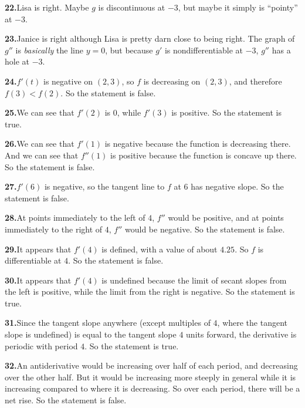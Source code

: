 \documentclass[10pt,oneside,]{book}
\newcommand{\lt}{<}
\theoremstyle{plain}
\theoremstyle{definition}
\numberwithin{equation}{section}
\newcommand{\fe}[2]{#1\mathopen{}\left(#2\right)\mathclose{}}
\newcommand{\ointerval}[2]{\left(#1,#2\right)}
\newcommand{\fd}[1]{#1'}
\newcommand{\sd}[1]{#1''}
\begin{document}
\par\smallskip
\noindent\textbf{22.}\quad{}Lisa is right.  Maybe \(g\) is discontinuous at \(-3\), but maybe it simply is ``pointy'' at \(-3\).%
\par\smallskip
\noindent\textbf{23.}\quad{}Janice is right although Lisa is pretty darn close to being right. The graph of \(\sd{g}\) is \emph{basically} the line \(y=0\), but because \(\fd{g}\) is nondifferentiable at \(-3\), \(\sd{g}\) has a hole at \(-3\).%
\par\smallskip
\noindent\textbf{24.}\quad{}\(\fe{\fd{f}}{t}\) is negative on \(\ointerval{2}{3}\), so \(f\) is decreasing on \(\ointerval{2}{3}\), and therefore \(\fe{f}{3}\lt\fe{f}{2}\). So the statement is false.%
\par\smallskip
\noindent\textbf{25.}\quad{}We can see that \(\fe{\fd{f}}{2}\) is \(0\), while \(\fe{\fd{f}}{3}\) is positive. So the statement is true.%
\par\smallskip
\noindent\textbf{26.}\quad{}We can see that \(\fe{\fd{f}}{1}\) is negative because the function is decreasing there. And we can see that \(\fe{\sd{f}}{1}\) is positive because the function is concave up there. So the statement is false.%
\par\smallskip
\noindent\textbf{27.}\quad{}\(\fe{\fd{f}}{6}\) is negative, so the tangent line to \(f\) at \(6\) has negative slope. So the statement is false.%
\par\smallskip
\noindent\textbf{28.}\quad{}At points immediately to the left of \(4\), \(\sd{f}\) would be positive, and at points immediately to the right of \(4\), \(\sd{f}\) would be negative. So the statement is false.%
\par\smallskip
\noindent\textbf{29.}\quad{}It appears that \(\fe{\fd{f}}{4}\) is defined, with a value of about \(4.25\). So \(f\) is differentiable at \(4\). So the statement is false.%
\par\smallskip
\noindent\textbf{30.}\quad{}It appears that \(\fe{\fd{f}}{4}\) is undefined because the limit of secant slopes from the left is positive, while the limit from the right is negative. So the statement is true.%
\par\smallskip
\noindent\textbf{31.}\quad{}Since the tangent slope anywhere (except multiples of \(4\), where the tangent slope is undefined) is equal to the tangent slope \(4\) units forward, the derivative is periodic with period \(4\). So the statement is true.%
\par\smallskip
\noindent\textbf{32.}\quad{}An antiderivative would be increasing over half of each period, and decreasing over the other half. But it would be increasing more steeply in general while it is increasing compared to where it is decreasing. So over each period, there will be a net rise. So the statement is false.%
\end{document}

